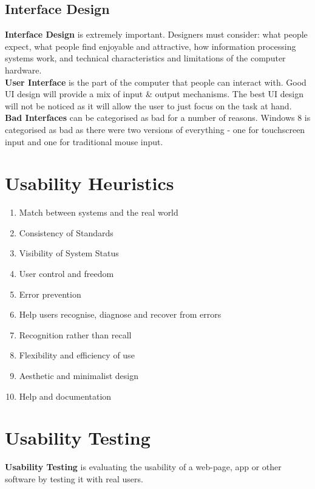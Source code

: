 \documentclass[a4paper,11pt]{article}
\begin{document}
\subsection{Interface Design}
\textbf{Interface Design} is extremely important. Designers must consider: what people expect, what people find enjoyable and attractive, how information processing systems work, and technical characteristics and limitations of the computer hardware.\\
\textbf{User Interface} is the part of the computer that people can interact with. Good UI design will provide a mix of input \& output mechanisms. The best UI design will not be noticed as it will allow the user to just focus on the task at hand.\\
\textbf{Bad Interfaces} can be categorised as bad for a number of reasons. Windows 8 is categorised as bad as there were two versions of everything - one for touchscreen input and one for traditional mouse input.

\section{Usability Heuristics}
\begin{enumerate}
    \item Match between systems and the real world
    \item Consistency of Standards
    \item Visibility of System Status
    \item User control and freedom
    \item Error prevention
    \item Help users recognise, diagnose and recover from errors
    \item Recognition rather than recall
    \item Flexibility and efficiency of use
    \item Aesthetic and minimalist design
    \item Help and documentation
\end{enumerate}

\section{Usability Testing}
\textbf{Usability Testing} is evaluating the usability of a web-page, app or other software by testing it with real users.
\end{document}

